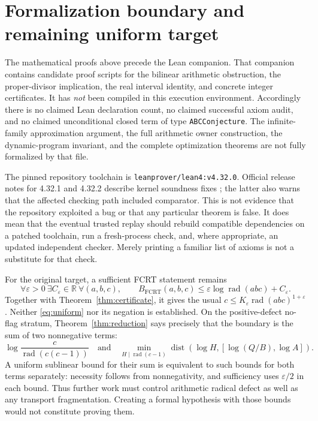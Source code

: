 \documentclass[11pt]{article}
\theoremstyle{definition}\newtheorem{definition}[theorem]{Definition}
\theoremstyle{remark}\newtheorem{remark}[theorem]{Remark}
\newcommand{\rad}{\operatorname{rad}}
\newcommand{\dist}{\operatorname{dist}}
\newcommand{\FCRT}{\mathrm{FCRT}}
\newcommand{\R}{\mathbb R}
\begin{document}
\section{Formalization boundary and remaining uniform target}
The mathematical proofs above precede the Lean companion. That companion
contains candidate proof scripts for the bilinear arithmetic obstruction,
the proper-divisor implication, the real interval identity, and concrete
integer certificates. It has \emph{not} been compiled in this execution
environment. Accordingly there is no claimed Lean declaration count, no
claimed successful axiom audit, and no claimed unconditional closed term
of type \texttt{ABCConjecture}. The infinite-family approximation argument,
the full arithmetic owner construction, the dynamic-program invariant, and
the complete optimization theorems are not fully formalized by that file.

The pinned repository toolchain is \texttt{leanprover/lean4:v4.32.0}.
Official release notes for 4.32.1 and 4.32.2 describe kernel soundness fixes
\cite{lean321,lean322}; the latter also warns that the affected checking path
included comparator. This is not evidence that the repository exploited a
bug or that any particular theorem is false. It does mean that the eventual
trusted replay should rebuild compatible dependencies on a patched toolchain,
run a fresh-process check, and, where appropriate, an updated independent
checker. Merely printing a familiar list of axioms is not a substitute for
that check.

For the original target, a sufficient FCRT statement remains
\begin{equation}\label{eq:uniform}
 \forall\varepsilon>0\ \exists C_\varepsilon\in\R\
 \forall (a,b,c),\qquad
 B_{\FCRT}(a,b,c)\le\varepsilon\log\rad(abc)+C_\varepsilon.
\end{equation}
Together with Theorem~\ref{thm:certificate}, it gives the usual
\(c\le K_\varepsilon\rad(abc)^{1+\varepsilon}\).
Neither \eqref{eq:uniform} nor its negation is established.
On the positive-defect no-flag stratum, Theorem~\ref{thm:reduction} says
precisely that the boundary is the sum of two nonnegative terms:
\[
 \log\frac{c}{\rad(c(c-1))}
 \quad\text{and}\quad
 \min_{H\mid\rad(c-1)}\dist\!\left(\log H,
       [\log(Q/B),\log A]\right).
\]
A uniform sublinear bound for their sum is equivalent to such bounds for
both terms separately: necessity follows from nonnegativity, and sufficiency
uses \(\varepsilon/2\) in each bound. Thus further work must control
arithmetic radical defect as well as any transport fragmentation. Creating a
formal hypothesis with those bounds would not constitute proving them.
\end{document}
